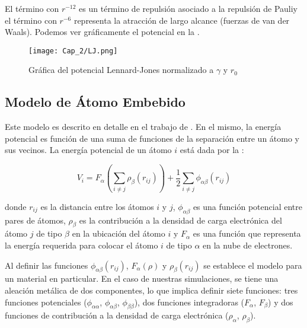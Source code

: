 El término con $r^{-12}$ es un término de repulsión asociado a la repulsión de Pauli\footnotemark[4] y el término con $r^{-6}$ representa la atracción de largo alcance (fuerzas de van der Waals\footnotemark[5]). Podemos ver gráficamente el potencial en la .


\begin{figure}[htp]
\centering
\texttt{[image: Cap\_2/LJ.png]}
\caption[Potencial de Lennard-Jones]{Gráfica del potencial Lennard-Jones normalizado a $\gamma$ y $r_{0}$}
\label{C2:fg:LJ}
\end{figure}

\subsection{Modelo de Átomo Embebido}
\label{SS2_3_2}

Este modelo es descrito en detalle en el trabajo de \cite{daw84}. En el mismo, la energía potencial es función de una suma de funciones de la separación entre un átomo y sus vecinos. La energía potencial de un átomo $i$ está dada por la :

\begin{equation}
V_{i} = F_{\alpha}\left(\sum_{i\neq j} \rho_{\beta} (r_{ij}) \right) + \frac{1}{2} \sum_{i\neq j} \phi_{\alpha\beta}(r_{ij})
\label{C2:eq:EAM}
\end{equation}

donde $r_{ij}$ es la distancia entre los átomos $i$ y $j$, $\phi_{\alpha\beta}$ es una función potencial entre pares de átomos, $\rho_{\beta}$ es la contribución a la densidad de carga electrónica del átomo $j$ de tipo $\beta$ en la ubicación del átomo $i$ y $F_{\alpha}$ es una función que representa la energía requerida para colocar el átomo $i$ de tipo $\alpha$ en la nube de electrones.

Al definir las funciones $\phi_{\alpha\beta}(r_{ij})$, $F_{\alpha}(\rho)$ y $\rho_{\beta} (r_{ij})$ se establece el modelo para un material en particular. En el caso de nuestras simulaciones, se tiene una aleación metálica de dos componentes, lo que implica definir siete funciones: tres funciones potenciales ($\phi_{\alpha\alpha}$, $\phi_{\alpha\beta}$, $\phi_{\beta\beta}$), dos funciones integradoras ($F_{\alpha}$, $F_{\beta}$) y dos funciones de contribución a la densidad de carga electrónica ($\rho_{\alpha}$, $\rho_{\beta}$).

